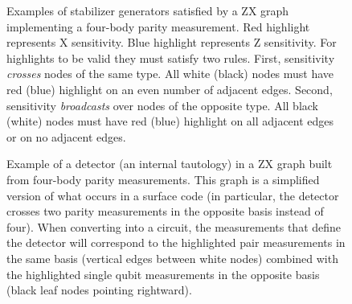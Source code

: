 \documentclass[onecolumn,unpublished,a4paper]{quantumarticle}
\theoremstyle{definition}
\theoremstyle{definition}
\theoremstyle{definition}
\begin{document}
\begin{figure}[h]
    \centering
    \caption{
        Examples of stabilizer generators satisfied by a ZX graph implementing a four-body parity measurement.
        Red highlight represents X sensitivity.
        Blue highlight represents Z sensitivity.
        For highlights to be valid they must satisfy two rules.
        First, sensitivity \emph{crosses} nodes of the same type.
        All white (black) nodes must have red (blue) highlight on an even number of adjacent edges.
        Second, sensitivity \emph{broadcasts} over nodes of the opposite type.
        All black (white) nodes must have red (blue) highlight on all adjacent edges or on no adjacent edges.
    }
    \label{fig:zx_stabilizer_examples}
\end{figure}

\begin{figure}[H]
    \centering
    \caption{
        Example of a detector (an internal tautology) in a ZX graph built from four-body parity measurements.
        This graph is a simplified version of what occurs in a surface code (in particular, the detector crosses two parity measurements in the opposite basis instead of four).
        When converting into a circuit, the measurements that define the detector will correspond to the highlighted pair measurements in the same basis (vertical edges between white nodes) combined with the highlighted single qubit measurements in the opposite basis (black leaf nodes pointing rightward).
    }
    \label{fig:zx_detector_example}
\end{figure}
\end{document}
